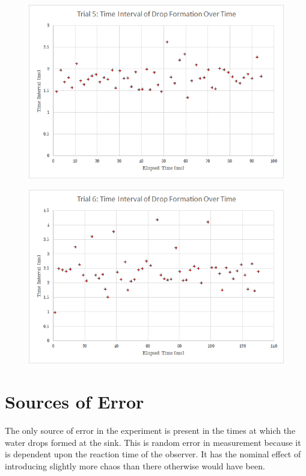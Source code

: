 \documentclass[a4paper]{article}
\begin{document}
\begin{figure}[H]
\centering
\begin{minipage}{.5\textwidth}
  \centering
  \includegraphics[width=\linewidth]{sink5.png}
  \label{fig:test5}
\end{minipage}%
\begin{minipage}{.5\textwidth}
  \centering
  \includegraphics[width=\linewidth]{sink6.png}
  \label{fig:test6}
\end{minipage}
\end{figure}

\section{Sources of Error}

\qq The only source of error in the experiment is present in the times at which
the water drops formed at the sink. This is random error in measurement because
it is dependent upon the reaction time of the observer. It has the nominal
effect of introducing slightly more chaos than there otherwise would have been. 
\end{document}
